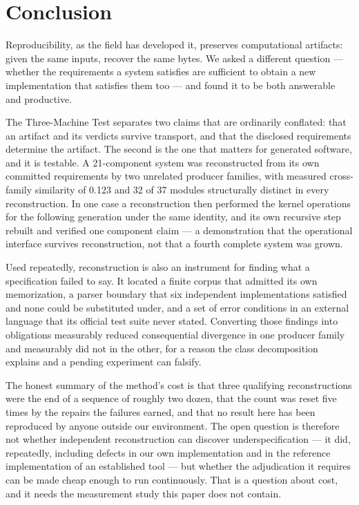 \documentclass[10pt,twocolumn]{article}
\begin{document}
\section{Conclusion}
\label{sec:conclusion}

Reproducibility, as the field has developed it, preserves computational
artifacts: given the same inputs, recover the same bytes. We asked a
different question --- whether the requirements a system satisfies are
sufficient to obtain a new implementation that satisfies them too --- and
found it to be both answerable and productive.

The Three-Machine Test separates two claims that are ordinarily
conflated: that an artifact and its verdicts survive transport, and that
the disclosed requirements determine the artifact. The second is the one
that matters for generated software, and it is testable. A 21-component
system was reconstructed from its own committed requirements by two
unrelated producer families, with measured cross-family similarity of
0.123 and 32 of 37 modules structurally distinct in every
reconstruction. In one case a reconstruction then performed the kernel
operations for the following generation under the same identity, and its
own recursive step rebuilt and verified one component claim --- a
demonstration that the operational interface survives reconstruction,
not that a fourth complete system was grown.

Used repeatedly, reconstruction is also an instrument for finding what a
specification failed to say. It located a finite corpus that admitted its
own memorization, a parser boundary that six independent implementations
satisfied and none could be substituted under, and a set of
error conditions in an external language that its official test suite
never stated. Converting those findings into obligations measurably
reduced consequential divergence in one producer family and measurably
did not in the other, for a reason the class decomposition explains and
a pending experiment can falsify.

The honest summary of the method's cost is that three qualifying
reconstructions were the end of a sequence of roughly two dozen, that the
count was reset five times by the repairs the failures earned, and that
no result here has been reproduced by anyone outside our environment. The
open question is therefore not whether independent reconstruction can
discover underspecification --- it did, repeatedly, including defects in
our own implementation and in the reference implementation of an
established tool --- but whether the adjudication it requires can be made
cheap enough to run continuously. That is a question about cost, and it
needs the measurement study this paper does not contain.
\end{document}
